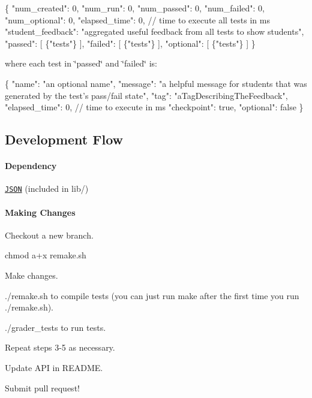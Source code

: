 \begin{DoxyCode}
\{
  "num\_created": 0,
  "num\_run": 0,
  "num\_passed": 0,
  "num\_failed": 0,
  "num\_optional": 0,
  "elapsed\_time": 0, // time to execute all tests in ms
  "student\_feedback": "aggregated useful feedback from all tests to show students",
  "passed": [ \{"tests"\} ],
  "failed": [ \{"tests"\} ],
  "optional": [ \{"tests"\} ]
\}
\end{DoxyCode}


where each {\ttfamily test} in {\ttfamily \char`\"{}passed\char`\"{}} and {\ttfamily \char`\"{}failed\char`\"{}} is\+:


\begin{DoxyCode}
\{
  "name": "an optional name",
  "message": "a helpful message for students that was generated by the test's pass/fail state",
  "tag": "aTagDescribingTheFeedback",
  "elapsed\_time": 0, // time to execute in ms
  "checkpoint": true,
  "optional": false
\}
\end{DoxyCode}


\subsection*{Development Flow}

\paragraph*{Dependency}

\href{https://github.com/nlohmann/json}{\tt J\+S\+ON} (included in lib/)

\paragraph*{Making Changes}


\begin{DoxyEnumerate}
\item Checkout a new branch.
\item {\ttfamily chmod a+x remake.\+sh}
\item Make changes.
\item {\ttfamily ./remake.sh} to compile tests (you can just run {\ttfamily make} after the first time you run {\ttfamily ./remake.sh}).
\item {\ttfamily ./grader\+\_\+tests} to run tests.
\item Repeat steps 3-\/5 as necessary.
\item Update A\+PI in R\+E\+A\+D\+ME.
\item Submit pull request! 
\end{DoxyEnumerate}